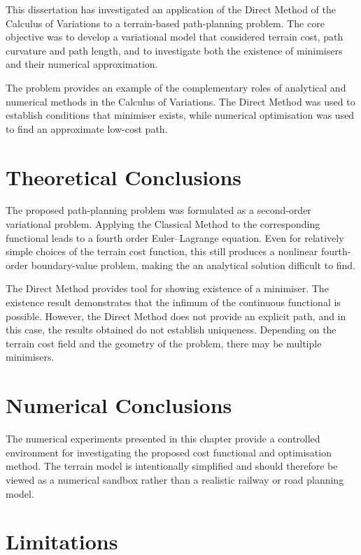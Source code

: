This dissertation has investigated an application of the Direct Method of the Calculus of Variations to a terrain-based path-planning problem. The core objective was to develop a variational model that considered terrain cost, path curvature and path length, and to investigate both the existence of minimisers and their numerical approximation.

The problem provides an example of the complementary roles of analytical and numerical methods in the Calculus of Variations. The Direct Method was used to establish conditions that minimiser exists, while numerical optimisation was used to find an approximate low-cost path.

\section{Theoretical Conclusions}

The proposed path-planning problem was formulated as a second-order variational problem. Applying the Classical Method to the corresponding functional leads to a fourth order Euler--Lagrange equation. Even for relatively simple choices of the terrain cost function, this still produces a nonlinear fourth-order boundary-value problem, making the an analytical solution difficult to find.

The Direct Method provides tool for showing existence of a minimiser. The existence result demonstrates that the infimum of the continuous functional is possible. However, the Direct Method does not provide an explicit path, and in this case, the results obtained do not establish uniqueness. Depending on the terrain cost field and the geometry of the problem, there may be multiple minimisers.

\section{Numerical Conclusions}

The numerical experiments presented in this chapter provide a
controlled environment for investigating the proposed cost functional
and optimisation method. The terrain model is intentionally simplified
and should therefore be viewed as a numerical sandbox rather than a
realistic railway or road planning model.

\section{Limitations}

